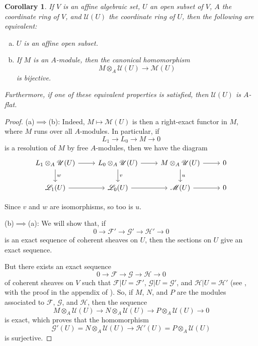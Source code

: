 \documentclass{article}
\theoremstyle{plain}
\newtheorem*{corollary}{Corollary}
\theoremstyle{definition}
\newcommand{\sh}{\mathscr}
\newcommand{\oldpage}[1]{\marginpar{\footnotesize$\Big\vert$ \textit{p.~#1}}}
\begin{document}
\begin{corollary}
  If $V$ is an affine algebraic set, $U$ an open subset of $V$, $A$ the coordinate ring of $V$, and $\sh{U}(U)$ the coordinate ring of $U$, then the following are equivalent:
  \begin{enumerate}[(a)]
    \item $U$ is an affine open subset.
    \item If $M$ is an $A$-module, then the canonical homomorphism
      \[
        M\otimes_A\sh{U}(U) \to \sh{M}(U)
      \]
      is bijective.
  \end{enumerate}

\oldpage{2-08}
  Furthermore, if one of these equivalent properties is satisfied, then $\sh{U}(U)$ is $A$-flat.
\end{corollary}

\begin{proof}
  (a)$\implies$(b):
  Indeed, $M\mapsto\sh{M}(U)$ is then a right-exact functor in $M$, where $M$ runs over all $A$-modules.
  In particular, if
  \[
    L_1 \to L_0 \to M \to 0
  \]
  is a resolution of $M$ by free $A$-modules, then we have the diagram
  \[
    \begin{tikzcd}
      L_1\otimes_A\sh{U}(U) \rar \dar["w"]
      & L_0\otimes_A\sh{U}(U) \rar \dar["v"]
      & M\otimes_A\sh{U}(U) \rar \dar["u"]
      & 0
    \\\sh{L}_1(U) \rar
      & \sh{L}_0(U) \rar
      & \sh{M}(U) \rar
      & 0
    \end{tikzcd}
  \]

  Since $v$ and $w$ are isomorphisms, so too is $u$.

  \bigskip
  (b)$\implies$(a):
  We will show that, if
  \[
    0 \to \sh{F}' \to\sh{G}' \to \sh{H}' \to 0
  \]
  is an exact sequence of coherent sheaves on $U$, then the sections on $U$ give an exact sequence.

  But there exists an exact sequence
  \[
    0 \to \sh{F} \to \sh{G} \to \sh{H} \to 0
  \]
  of coherent sheaves on $V$ such that $\sh{F}|U=\sh{F}'$, $\sh{G}|U=\sh{G}'$, and $\sh{H}|U=\sh{H}'$ (see \cite{1}, with the proof in the appendix of \cite{2}).
  So, if $M$, $N$, and $P$ are the modules associated to $\sh{F}$, $\sh{G}$, and $\sh{H}$, then the sequence
  \[
    M\otimes_A\sh{U}(U) \to N\otimes_A\sh{U}(U) \to P\otimes_A\sh{U}(U) \to 0
  \]
  is exact, which proves that the homomorphism
  \[
    \sh{G}'(U) = N\otimes_A\sh{U}(U) \to \sh{H}'(U) = P\otimes_A\sh{U}(U)
  \]
  is surjective.
\end{proof}
\end{document}

